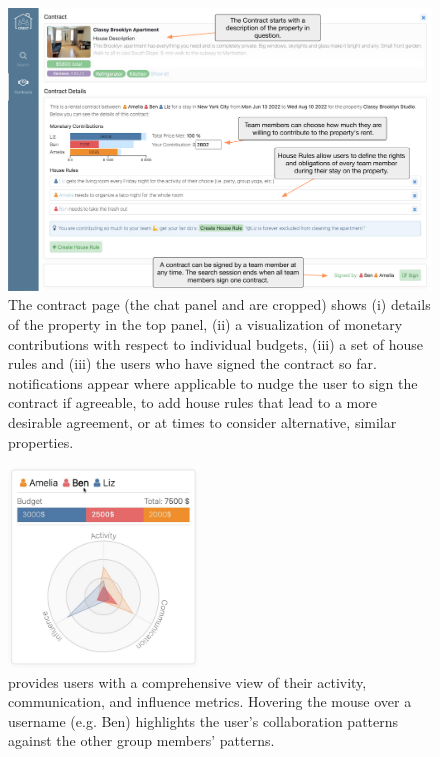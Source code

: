 \begin{figure}
    \centering
    \includegraphics[width=1\textwidth]{images/ui-contracts.pdf}
    \caption{The contract page (the chat panel and \collaboRatio are cropped) shows (i) details of the property in the top panel, (ii) a visualization of monetary contributions with respect to individual budgets, (iii) a set of house rules and (iii) the users who have signed the contract so far. \cbot notifications appear where applicable to nudge the user to sign the contract if agreeable, to add house rules that lead to a more desirable agreement, or at times to consider alternative, similar properties.}
    \label{fig:ui_contracts}
\end{figure}

\begin{figure}
    \includegraphics[width=0.45\textwidth]{images/ui-collaboratio.jpg}
    \caption{\collaboRatio provides users with a comprehensive view of their activity, communication, and influence metrics. Hovering the mouse over a username (e.g. Ben) highlights the user's collaboration patterns against the other group members' patterns.}
    \label{fig:collaboratio}
\end{figure}

